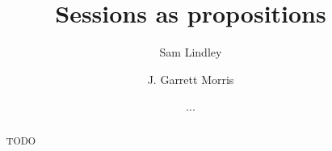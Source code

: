 \documentclass{easychair}
\begin{document}
\title{Sessions as propositions}



%
\author{
  Sam Lindley
  \and
  J. Garrett Morris
  \and
  ...
}





\clearpage

\maketitle

\begin{abstract}
TODO
\end{abstract}
\end{document}
